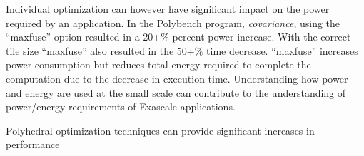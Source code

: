 Individual optimization can however
have significant impact on the power required by an
application. In the Polybench program, \emph{covariance},
using the ``maxfuse'' option resulted in a 20+\% percent power
increase. With the correct tile size ``maxfuse'' also
resulted in the 50+\% time decrease. ``maxfuse'' increases power 
consumption but reduces total energy required to complete the computation due to
the decrease in execution time.
Understanding how power and energy are used at the small
scale can contribute to the understanding of power/energy requirements of Exascale applications.

Polyhedral optimization techniques can provide significant 
increases in performance


